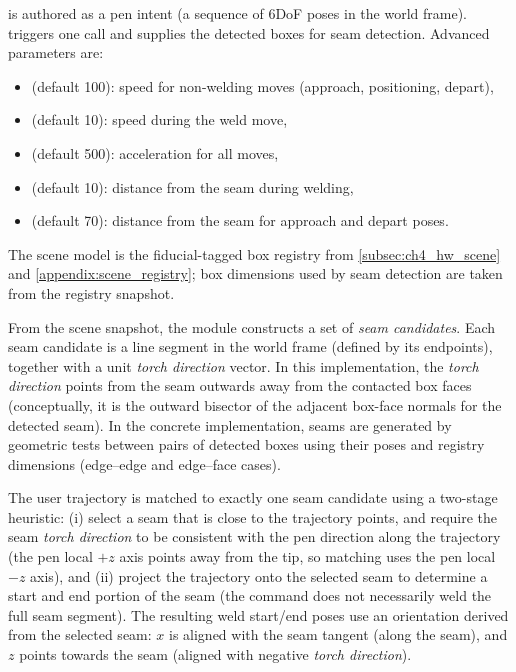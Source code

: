  is authored as a pen  intent (a sequence of 6DoF poses in the world frame).  triggers one  call and supplies the detected boxes for seam detection.
Advanced parameters are:
\begin{itemize}[nosep]
    \item {} (default 100): speed for non-welding moves (approach, positioning, depart),
    \item {} (default 10): speed during the weld move,
    \item {} (default 500): acceleration for all moves,
    \item {} (default 10): distance from the seam during welding,
    \item {} (default 70): distance from the seam for approach and depart poses.
\end{itemize}
The scene model is the fiducial-tagged box registry from \autoref{subsec:ch4_hw_scene} and \autoref{appendix:scene_registry}; box dimensions used by seam detection are taken from the registry snapshot.

From the scene snapshot, the module constructs a set of \emph{seam candidates}. Each seam candidate is a line segment in the world frame (defined by its endpoints), together with a unit \emph{torch direction} vector.
In this implementation, the \emph{torch direction} points from the seam outwards away from the contacted box faces (conceptually, it is the outward bisector of the adjacent box-face normals for the detected seam).
In the concrete implementation, seams are generated by geometric tests between pairs of detected boxes using their poses and registry dimensions (edge--edge and edge--face cases).

The user trajectory is matched to exactly one seam candidate using a two-stage heuristic:
(i) select a seam that is close to the trajectory points, and require the seam \emph{torch direction} to be consistent with the pen direction along the trajectory (the pen local $+z$ axis points away from the tip, so matching uses the pen local $-z$ axis), and
(ii) project the trajectory onto the selected seam to determine a start and end portion of the seam (the command does not necessarily weld the full seam segment).
The resulting weld start/end poses use an orientation derived from the selected seam: $x$ is aligned with the seam tangent (along the seam), and $z$ points towards the seam (aligned with negative \emph{torch direction}).

